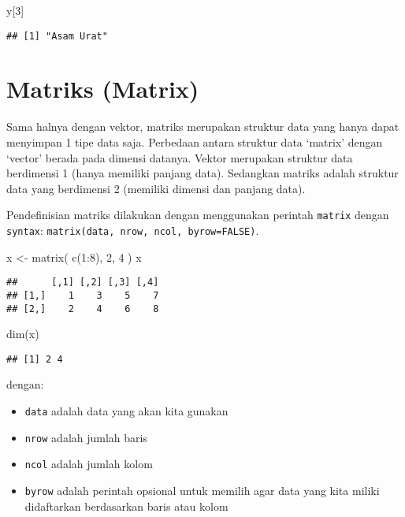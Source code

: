 \documentclass[
]{book}
\newenvironment{Shaded}{\begin{snugshade}}{\end{snugshade}}
\newcommand{\DecValTok}[1]{\textcolor[rgb]{0.00,0.00,0.81}{#1}}
\newcommand{\FunctionTok}[1]{\textcolor[rgb]{0.00,0.00,0.00}{#1}}
\newcommand{\NormalTok}[1]{#1}
\newcommand{\OtherTok}[1]{\textcolor[rgb]{0.56,0.35,0.01}{#1}}
\newcommand{\SpecialCharTok}[1]{\textcolor[rgb]{0.00,0.00,0.00}{#1}}
\providecommand{\tightlist}{%
  \setlength{\itemsep}{0pt}\setlength{\parskip}{0pt}}
\begin{document}
\begin{Shaded}
\begin{Highlighting}[]
\NormalTok{y[}\DecValTok{3}\NormalTok{]}
\end{Highlighting}
\end{Shaded}

\begin{verbatim}
## [1] "Asam Urat"
\end{verbatim}

\hypertarget{matrix}{%
\section{Matriks (Matrix)}\label{matrix}}

Sama halnya dengan vektor, matriks merupakan struktur data yang hanya dapat menyimpan 1 tipe data saja. Perbedaan antara struktur data `matrix' dengan `vector' berada pada dimensi datanya. Vektor merupakan struktur data berdimensi 1 (hanya memiliki panjang data). Sedangkan matriks adalah struktur data yang berdimensi 2 (memiliki dimensi dan panjang data).

Pendefinisian matriks dilakukan dengan menggunakan perintah \texttt{matrix} dengan \texttt{syntax}: \texttt{matrix(data,\ nrow,\ ncol,\ byrow=FALSE)}.

\begin{Shaded}
\begin{Highlighting}[]
\NormalTok{x }\OtherTok{\textless{}{-}} \FunctionTok{matrix}\NormalTok{(}
  \FunctionTok{c}\NormalTok{(}\DecValTok{1}\SpecialCharTok{:}\DecValTok{8}\NormalTok{), }\DecValTok{2}\NormalTok{, }\DecValTok{4}
\NormalTok{)}
\NormalTok{x}
\end{Highlighting}
\end{Shaded}

\begin{verbatim}
##      [,1] [,2] [,3] [,4]
## [1,]    1    3    5    7
## [2,]    2    4    6    8
\end{verbatim}

\begin{Shaded}
\begin{Highlighting}[]
\FunctionTok{dim}\NormalTok{(x)}
\end{Highlighting}
\end{Shaded}

\begin{verbatim}
## [1] 2 4
\end{verbatim}

dengan:

\begin{itemize}
\tightlist
\item
  \texttt{data} adalah data yang akan kita gunakan
\item
  \texttt{nrow} adalah jumlah baris
\item
  \texttt{ncol} adalah jumlah kolom
\item
  \texttt{byrow} adalah perintah opsional untuk memilih agar data yang kita miliki didaftarkan berdasarkan baris atau kolom
\end{itemize}
\end{document}
